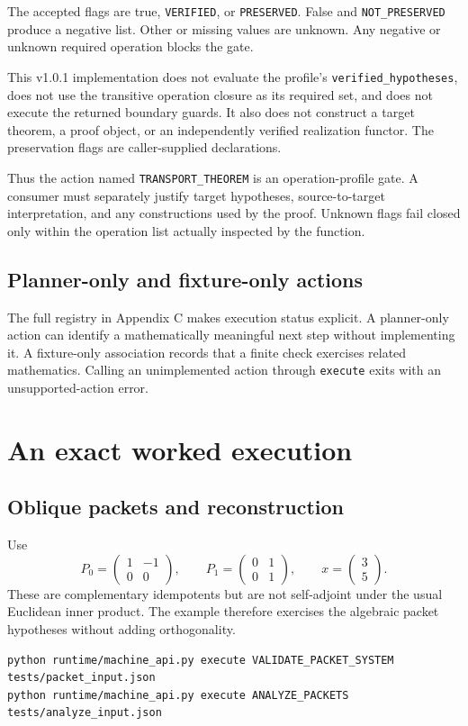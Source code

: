 \documentclass[a4paper,11pt]{article}
\begin{document}
The accepted flags are true, \nolinkurl{VERIFIED}, or \nolinkurl{PRESERVED}. False and \nolinkurl{NOT_PRESERVED} produce a negative list. Other or missing values are unknown. Any negative or unknown required operation blocks the gate.

This v1.0.1 implementation does not evaluate the profile's \nolinkurl{verified_hypotheses}, does not use the transitive operation closure as its required set, and does not execute the returned boundary guards. It also does not construct a target theorem, a proof object, or an independently verified realization functor. The preservation flags are caller-supplied declarations.

Thus the action named \nolinkurl{TRANSPORT_THEOREM} is an operation-profile gate. A consumer must separately justify target hypotheses, source-to-target interpretation, and any constructions used by the proof. Unknown flags fail closed only within the operation list actually inspected by the function.
\subsection{Planner-only and fixture-only actions}
The full registry in Appendix C makes execution status explicit. A planner-only action can identify a mathematically meaningful next step without implementing it. A fixture-only association records that a finite check exercises related mathematics. Calling an unimplemented action through \nolinkurl{execute} exits with an unsupported-action error.

\section{An exact worked execution}
\subsection{Oblique packets and reconstruction}
Use
\[
P_0=\begin{pmatrix}1&-1\\0&0\end{pmatrix},\qquad
P_1=\begin{pmatrix}0&1\\0&1\end{pmatrix},\qquad
x=\begin{pmatrix}3\\5\end{pmatrix}.
\]
These are complementary idempotents but are not self-adjoint under the usual Euclidean inner product. The example therefore exercises the algebraic packet hypotheses without adding orthogonality.
\begin{lstlisting}
python runtime/machine_api.py execute VALIDATE_PACKET_SYSTEM tests/packet_input.json
python runtime/machine_api.py execute ANALYZE_PACKETS tests/analyze_input.json
\end{lstlisting}
\end{document}
